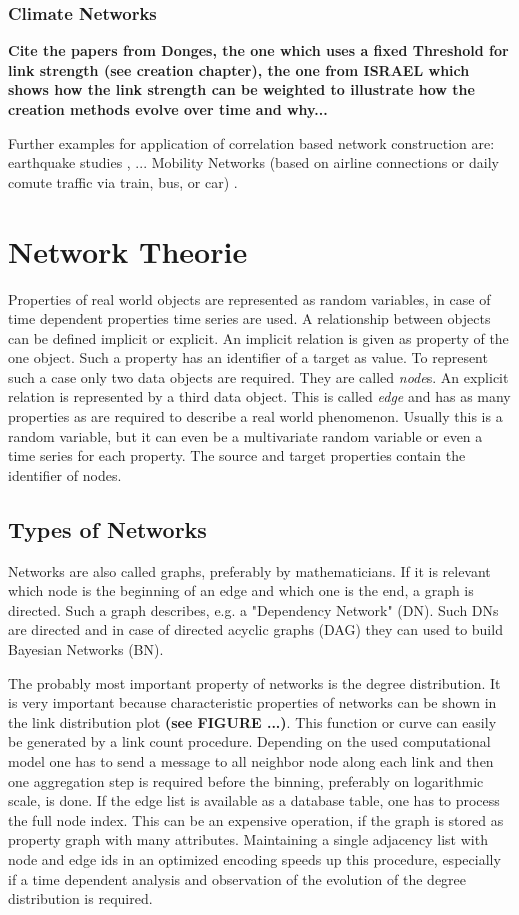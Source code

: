 \documentclass[a4paper,10pt]{scrbook}
\begin{document}
\subsection{Climate Networks}

\textbf{Cite the papers from Donges, the one which uses a fixed Threshold for link strength (see creation chapter), the one from ISRAEL which shows how the link strength can be weighted to illustrate how the creation methods evolve over time and why...} 

Further examples for application of correlation based network construction are: earthquake studies \cite{Tenenbaum2012}, ...
Mobility Networks (based on airline connections or daily comute traffic via train, bus, or car) \cite{Vespignani2009}.

\chapter{Network Theorie}

Properties of real world objects are represented as random variables, in case of time dependent properties time series are used. A relationship between objects can be defined implicit or explicit. An implicit relation is given as property of the one object. Such a property has an identifier of a target as value. To represent such a case only two data objects are required. They are called \textit{node}s. An explicit relation is represented by a third data object. This is called \textit{edge} and has as many properties as are required to describe a real world phenomenon. Usually this is a random variable, but it can even be a multivariate random variable or even a time series for each property. The source and target properties contain the identifier of nodes. 

\section{Types of Networks}
\label{network.models} 
Networks are also called graphs, preferably by mathematicians. If it is relevant which node is the beginning of an edge and which one is the end, a graph is directed. Such a graph describes, e.g. a "Dependency Network" (DN). Such DNs are directed and in case of directed acyclic graphs (DAG) they can used to build Bayesian Networks (BN). 

The probably most important property of networks is the degree distribution. It is very important because characteristic properties of networks can be shown in the link distribution plot \textbf{(see FIGURE ...)}.
This function or curve can easily be generated by a link count procedure. Depending on the used computational model one has to send a message to all neighbor node along each link and then one aggregation step is required before the binning, preferably on logarithmic scale, is done. If the edge list is available as a database table, one has to process the full node index. This can be an expensive operation, if the graph is stored as property graph with many attributes. Maintaining a single adjacency list with node and edge ids in an optimized encoding speeds up this procedure, especially if a time dependent analysis and observation of the evolution of the degree distribution is required. 
\end{document}
